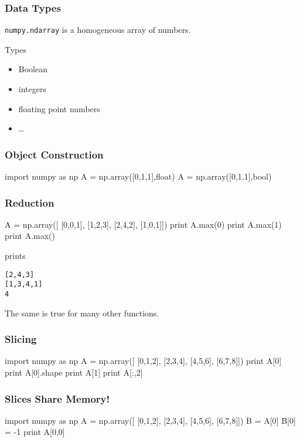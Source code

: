 \begin{frame}[fragile]
\frametitle{Data Types}

\lstinline{numpy.ndarray} is a homogeneous array of numbers.

\begin{block}{Types}
\begin{itemize}
\item Boolean
\item integers
\item floating point numbers
\item \ldots
\end{itemize}
\end{block}

\end{frame}

\begin{frame}[fragile]
\frametitle{Object Construction}

\begin{python}
import numpy as np
A = np.array([0,1,1],float)
A = np.array([0,1,1],bool)
\end{python}
\end{frame}

\begin{frame}[fragile]
\frametitle{Reduction}

\begin{python}
A = np.array([
    [0,0,1],
    [1,2,3],
    [2,4,2],
    [1,0,1]])
print A.max(0)
print A.max(1)
print A.max()
\end{python}
prints
\begin{verbatim}
[2,4,3]
[1,3,4,1]
4
\end{verbatim}

The same is true for many other functions.
\end{frame}

\begin{frame}[fragile]
\frametitle{Slicing}

\begin{python}
import numpy as np
A = np.array([
    [0,1,2],
    [2,3,4],
    [4,5,6],
    [6,7,8]])
print A[0]
print A[0].shape
print A[1]
print A[:,2]
\end{python}
\end{frame}

\begin{frame}[fragile]
\frametitle{Slices Share Memory!}
\begin{python}
import numpy as np
A = np.array([
    [0,1,2],
    [2,3,4],
    [4,5,6],
    [6,7,8]])
B = A[0]
B[0] = -1
print A[0,0]
\end{python}

\end{frame}

